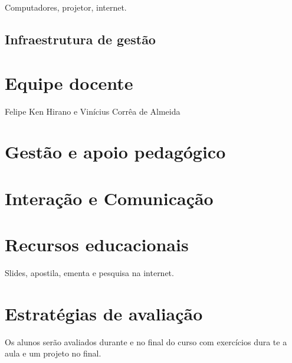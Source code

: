 Computadores, projetor, internet.

\subsection{Infraestrutura de gestão}

\section{Equipe docente}

Felipe Ken Hirano e Vinícius Corrêa de Almeida

\section{Gestão e apoio pedagógico}

\section{Interação e Comunicação}

\section{Recursos educacionais}

Slides, apostila, ementa e pesquisa na internet.

\section{Estratégias de avaliação}

Os alunos serão avaliados durante e no final do curso com exercícios dura te a aula e um projeto no final. 
